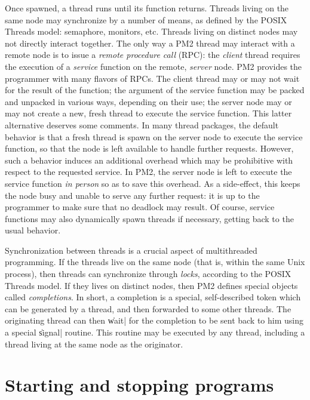 Once spawned, a thread runs until its function returns. Threads living
on the same node may synchronize by a number of means, as defined by
the POSIX Threads model: semaphore, monitors, etc. Threads living on
distinct nodes may not directly interact together. The only way a PM2
thread may interact with a remote node is to issue a \emph{remote
  procedure call} (RPC): the \emph{client} thread requires the
execution of a \emph{service} function on the remote, \emph{server}
node. PM2 provides the programmer with many flavors of RPCs. The
client thread may or may not wait for the result of the function; the
argument of the service function may be packed and unpacked in various
ways, depending on their use; the server node may or may not create a
new, fresh thread to execute the service function. This latter
alternative deserves some comments. In many thread packages, the
default behavior is that a fresh thread is spawn on the server node to
execute the service function, so that the node is left available to
handle further requests. However, such a behavior induces an
additional overhead which may be prohibitive with respect to the requested
service. In PM2, the server node is left to execute the service
function \emph{in person} so as to save this overhead. As a
side-effect, this keeps the node busy and unable to serve any further
request: it is up to the programmer to make sure that no deadlock may
result. Of course, service functions may also dynamically spawn
threads if necessary, getting back to the usual behavior.

Synchronization between threads is a crucial aspect of multithreaded
programming. If the threads live on the same node (that is, within the
same Unix process), then threads can synchronize through \emph{locks},
according to the POSIX Threads model. If they lives on distinct nodes,
then PM2 defines special objects called \emph{completions}. In
short, a completion is a special, self-described token which can be
generated by a thread, and then forwarded to some other threads. The
originating thread can then \|wait| for the completion to be sent back
to him using a special \|signal| routine. This routine may be executed
by any thread, including a thread living at the same node as the
originator. 


\section{Starting and stopping programs}

